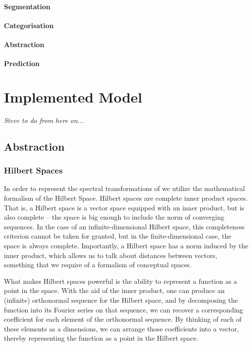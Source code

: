 \documentclass[runningheads]{llncs}
\begin{document}
\paragraph{Segmentation}
\paragraph{Categorisation}
\paragraph{Abstraction}
\paragraph{Prediction}


\section{Implemented Model}
{\it Steve to do from here on...}


\subsection{Abstraction}

\subsubsection{Hilbert Spaces}
In order to represent the spectral transformations of we utilize the mathematical formalism of the Hilbert Space.  Hilbert spaces are complete inner product spaces.  That is, a Hilbert space is a vector space equipped with an inner product, but is also complete -- the space is big enough to include the norm of converging sequences.  In the case of an infinite-dimensional Hilbert space, this completeness criterion cannot be taken for granted, but in the finite-dimensional case, the space is always complete.  Importantly, a Hilbert space has a norm induced by the inner product, which allows us to talk about distances between vectors, something that we require of a formalism of conceptual spaces.

What makes Hilbert spaces powerful is the ability to represent a function as a point in the space.  With the aid of the inner product, one can produce an (infinite) orthonormal sequence for the Hilbert space, and by decomposing the function into its Fourier series on that sequence, we can recover a corresponding coefficient for each element of the orthonormal sequence.  By thinking of each of these elements as a dimensions, we can arrange those coefficients into a vector, thereby representing the function as a point in the Hilbert space.
\end{document}
